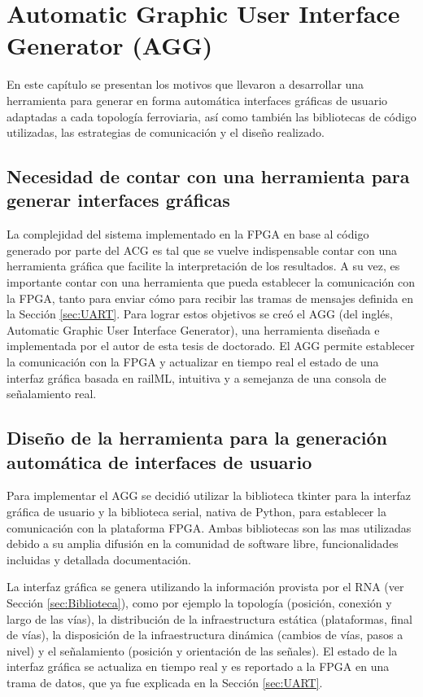 \chapter{Automatic Graphic User Interface Generator (AGG)}
	\label{sec:AGG}
	
	En este capítulo se presentan los motivos que llevaron a desarrollar una herramienta para generar en forma automática interfaces gráficas de usuario adaptadas a cada topología ferroviaria, así como también las bibliotecas de código utilizadas, las estrategias de comunicación y el diseño realizado.
	
	\section{Necesidad de contar con una herramienta para generar interfaces gráficas}
	
	La complejidad del sistema implementado en la FPGA en base al código generado por parte del ACG es tal que se vuelve indispensable contar con una herramienta gráfica que facilite la interpretación de los resultados. A su vez, es importante contar con una herramienta que pueda establecer la comunicación con la FPGA, tanto para enviar cómo para recibir las tramas de mensajes definida en la Sección \ref{sec:UART}. Para lograr estos objetivos se creó el AGG (del inglés, Automatic Graphic User Interface Generator), una herramienta diseñada e implementada por el autor de esta tesis de doctorado. El AGG permite establecer la comunicación con la FPGA y actualizar en tiempo real el estado de una interfaz gráfica basada en railML, intuitiva y a semejanza de una consola de señalamiento real.
	
	\section{Diseño de la herramienta para la generación automática de interfaces de usuario}
	
	Para implementar el AGG se decidió utilizar la biblioteca tkinter \cite{TKINTER} para la interfaz gráfica de usuario y la biblioteca serial, nativa de Python, para establecer la comunicación con la plataforma FPGA. Ambas bibliotecas son las mas utilizadas debido a su amplia difusión en la comunidad de software libre, funcionalidades incluidas y detallada documentación.
	
	La interfaz gráfica se genera utilizando la información provista por el RNA (ver Sección \ref{sec:Biblioteca}), como por ejemplo la topología (posición, conexión y largo de las vías), la distribución de la infraestructura estática (plataformas, final de vías), la disposición de la infraestructura dinámica (cambios de vías, pasos a nivel) y el señalamiento (posición y orientación de las señales). El estado de la interfaz gráfica se actualiza en tiempo real y es reportado a la FPGA en una trama de datos, que ya fue explicada en la Sección \ref{sec:UART}.
	
